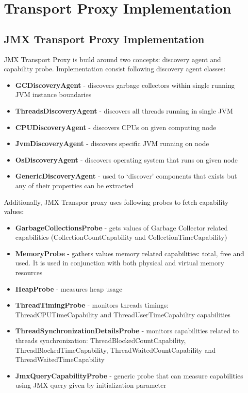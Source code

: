 \section{Transport Proxy Implementation}

\subsection{JMX Transport Proxy Implementation}

JMX Transport Proxy is build around two concepts: discovery agent and capability probe. Implementation consist following discovery agent classes:
\begin{itemize} 
  \item{\bf{GCDiscoveryAgent}} - discovers garbage collectors within single running JVM instance boundaries
  \item{\bf{ThreadsDiscoveryAgent}} - discovers all threads running in single JVM
  \item{\bf{CPUDiscoveryAgent}} - discovers CPUs on given computing node
  \item{\bf{JvmDiscoveryAgent}} - discovers specific JVM running on node
  \item{\bf{OsDiscoveryAgent}} - discovers operating system that runs on given node
  \item{\bf{GenericDiscoveryAgent}} - used to \lq{}discover\rq{} components that exists but any of their properties can be extracted
\end{itemize} 

Additionally, JMX Transpor proxy uses following probes to fetch capability values: 
\begin{itemize} 
  \item{\bf{GarbageCollectionsProbe}} - gets values of Garbage Collector related capabilities (CollectionCountCapability and CollectionTimeCapability)
  \item{\bf{MemoryProbe}} - gathers values memory related capabilities: total, free and used. It is used in conjunction with both physical and virtual memory resources
  \item{\bf{HeapProbe}} - measures heap usage  
  \item{\bf{ThreadTimingProbe}} - monitors threads timings: ThreadCPUTimeCapability and ThreadUserTimeCapability capabilities
  \item{\bf{ThreadSynchronizationDetailsProbe}} - monitors capabilities related to threads synchronization: ThreadBlockedCountCapability, ThreadBlockedTimeCapability, ThreadWaitedCountCapability and ThreadWaitedTimeCapability
  \item{\bf{JmxQueryCapabilityProbe}} - generic probe that can measure capabilities using JMX query given by initialization parameter
\end{itemize} 

